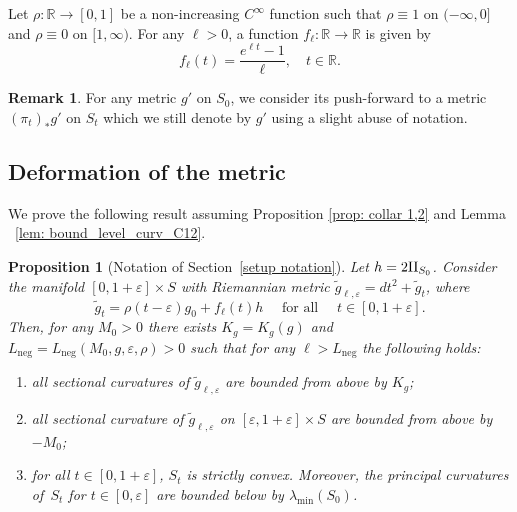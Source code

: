 \documentclass[10pt]{amsart}
\newenvironment{enumeratea}
{\bgroup\def\theenumi{\alph{enumi}}\begin{enumerate}}
{\end{enumerate}\egroup}
\newcommand{\Neg}{\mathrm{neg}}
\newtheorem{proposition}[theorem]{Proposition}
\theoremstyle{definition}
\newtheorem{remark}[theorem]{Remark}
\let\eps\varepsilon
\newcommand{\RomanNumeralCaps}[1]
{\MakeUppercase{\romannumeral #1}}
\newcommand{\II}{\textup{\RomanNumeralCaps{2}}}
\renewcommand{\>}{{\rangle}}
\newcommand{\<}{{\langle}}
\begin{document}
Let $\rho\colon\mathbb R\to [0,1]$ be a non-increasing $C^\infty$ function such that $\rho\equiv 1$ on $(-\infty,0]$ and $\rho\equiv 0$ on $[1,\infty)$. For any $\ell>0$, a function $f_{\ell}\colon\mathbb R\to\mathbb R$ is given by
\[
f_{\ell}(t)=\frac{e^{\ell t}-1}{\ell}
,\quad t\in\mathbb R.
\]

\begin{remark}
For any metric $g'$ on $S_0$, we consider its push-forward to a metric $(\pi_t)_*g'$ on $S_t$ which we still denote by $g'$ using a slight abuse of notation.
\end{remark}

\subsection{Deformation of the metric}
We prove the following result assuming Proposition \ref{prop: collar 1,2} and Lemma ~\ref{lem: bound_level_curv_C12}.
\begin{proposition}[Notation of Section~\ref{setup notation}]\label{collar 1,2}
 Let $h=2\II_{S_0}$. Consider the manifold $[0,1+\eps]\times S$ with Riemannian metric
$\tilde g_{\ell,\eps} = dt^2+\tilde g_t$, where
\begin{equation*}
\tilde g_t=\rho(t-\eps)g_0+f_{\ell}(t)h\quad \text{ for all }\quad t\in[0,1+\eps].
\end{equation*}
Then, for any $M_0>0$ there exists $K_g=K_g(g)$ and $L_{\Neg}=L_{\Neg}(M_0, g, \eps, \rho)>0$ such that for any $\ell>L_{\Neg}$ the following holds:
\begin{enumeratea}
\item\label{upper positive} all sectional curvatures of $\tilde g_{\ell,\eps}$ are bounded from above by $K_g$;
\item\label{upper negative from epsilon} all sectional curvature of $\tilde g_{\ell,\eps}$ on $[\eps,1+\eps]\times S$ are bounded from above by $-M_0$;
\item\label{convex in general} for all $t\in[0,1+\eps]$, $S_t$ is strictly convex. Moreover, the principal curvatures of~$S_t$ for $t\in[0,\eps]$ are bounded below by $\lambda_{\min}(S_0)$.
\end{enumeratea}
\end{proposition}
\end{document}

